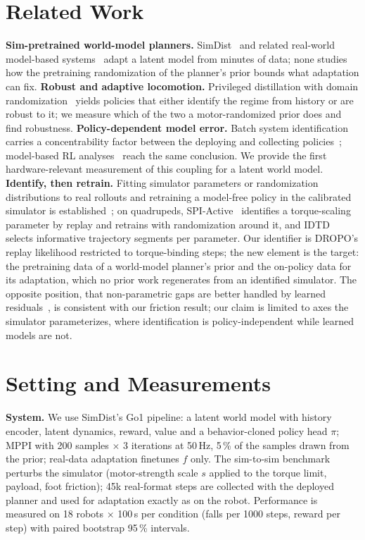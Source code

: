 \documentclass[conference]{IEEEtran}
\begin{document}
\section{Related Work}
\textbf{Sim-pretrained world-model planners.} SimDist~\cite{levy2026simdist} and related real-world model-based systems~\cite{wu2022daydreamer,hansen2024tdmpc2,hafner2023dreamerv3,feng2023fowm} adapt a latent model from minutes of data; none studies how the pretraining randomization of the planner's prior bounds what adaptation can fix. \textbf{Robust and adaptive locomotion.} Privileged distillation with domain randomization~\cite{kumar2021rma,long2024him,smith2023walk,ma2024dreureka} yields policies that either identify the regime from history or are robust to it; we measure which of the two a motor-randomized prior does and find robustness. \textbf{Policy-dependent model error.} Batch system identification carries a concentrability factor between the deploying and collecting policies~\cite{ross2012agnostic}; model-based RL analyses~\cite{janner2019mbpo,rajeswaran2020game,wang2023pdml,lambert2020objective} reach the same conclusion. We provide the first hardware-relevant measurement of this coupling for a latent world model. \textbf{Identify, then retrain.} Fitting simulator parameters or randomization distributions to real rollouts and retraining a model-free policy in the calibrated simulator is established~\cite{chebotar2019simopt,ramos2019bayessim,tiboni2023dropo,bjelonic2026pace}; on quadrupeds, SPI-Active~\cite{sobanbabu2025spiactive} identifies a torque-scaling parameter by replay and retrains with randomization around it, and IDTD~\cite{shin2026idtd} selects informative trajectory segments per parameter. Our identifier is DROPO's replay likelihood restricted to torque-binding steps; the new element is the target: the pretraining data of a world-model planner's prior and the on-policy data for its adaptation, which no prior work regenerates from an identified simulator. The opposite position, that non-parametric gaps are better handled by learned residuals~\cite{he2025asap,dao2026simadapt,lanier2025redraw}, is consistent with our friction result; our claim is limited to axes the simulator parameterizes, where identification is policy-independent while learned models are not.

\section{Setting and Measurements}
\textbf{System.} We use SimDist's Go1 pipeline: a latent world model with history encoder, latent dynamics, reward, value and a behavior-cloned policy head $\pi$; MPPI with 200 samples $\times$ 3 iterations at 50\,Hz, 5\,\% of the samples drawn from the prior; real-data adaptation finetunes $f$ only. The sim-to-sim benchmark perturbs the simulator (motor-strength scale $s$ applied to the torque limit, payload, foot friction); 45k real-format steps are collected with the deployed planner and used for adaptation exactly as on the robot. Performance is measured on 18 robots $\times$ 100\,s per condition (falls per 1000 steps, reward per step) with paired bootstrap 95\,\% intervals.
\end{document}
